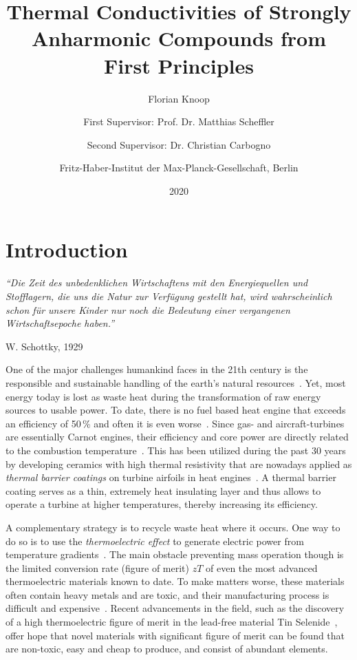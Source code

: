 \documentclass[a4paper,12pt]{book}
\title{
    Thermal Conductivities of Strongly Anharmonic Compounds from First Principles
}
\author{
    Florian Knoop
    \\ \and
    First Supervisor: Prof. Dr. Matthias Scheffler
    \and
    Second Supervisor: Dr. Christian Carbogno
    \\ \and
    Fritz-Haber-Institut der Max-Planck-Gesellschaft, Berlin
}
\date{2020}
\begin{document}
\maketitle
\tableofcontents

\chapter{Introduction}
\epigraph{\singlespacing \it ``Die Zeit des unbedenklichen Wirtschaftens mit den Energiequellen und Stofflagern, die uns die Natur zur Verfügung gestellt hat, wird wahrscheinlich schon für unsere Kinder nur noch die Bedeutung einer vergangenen Wirtschaftsepoche haben.''}{W. Schottky, 1929}
One of the major challenges humankind faces in the 21th century is the responsible and sustainable handling of the earth's natural resources~\cite{Schottky1929}.  Yet, most energy today is lost as waste heat during the transformation of raw energy sources to usable power. To date, there is no fuel based heat engine that exceeds an efficiency of 50\,\% and often it is even worse~\cite{eia}. 
Since gas- and aircraft-turbines are essentially Carnot engines, their efficiency and core power are directly related to the combustion temperature~\cite{Clarke2012,Perepezko2009}. This has been utilized during the past 30 years by developing 
ceramics with high thermal resistivity that are nowadays applied as \emph{thermal barrier coatings} on turbine airfoils in heat engines~\cite{Clarke2003}. A thermal barrier coating serves as a thin, extremely heat insulating layer and thus allows to operate a turbine at higher temperatures, thereby increasing its efficiency.

A complementary strategy is to recycle waste heat where it occurs. One way to do so is to use the
\emph{thermoelectric effect} to  generate electric power from temperature gradients~\cite{Snyder2008}. The main obstacle preventing mass operation though is the limited conversion rate (figure of merit) $zT$ of even the most advanced thermoelectric materials known to date. To make matters worse, these materials often contain heavy metals and are toxic, and their manufacturing process is difficult and expensive~\cite{Nolas2001}. Recent advancements in the field, such as the discovery of a high thermoelectric figure of merit in the lead-free material Tin Selenide~\cite{Zhao2014}, offer hope that novel materials with significant figure of merit can be found that are non-toxic, easy and cheap to produce, and consist of abundant elements.
\end{document}
